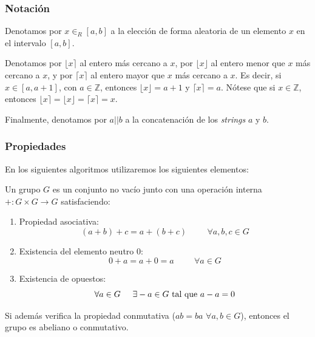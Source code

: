 \subsubsection{Notación}

Denotamos por $x \in_{R} [a, b]$ a la elección de forma aleatoria de un elemento $x$ en el intervalo $[a, b]$.

Denotamos por $\lfloor x \rceil$ al entero más cercano a $x$, por $\lfloor x \rfloor$ al entero menor que $x$ más cercano a $x$, y por $\lceil x \rceil$ al entero mayor que $x$ más cercano a $x$. Es decir, si $x \in [a, a+1]$, con $a \in \mathbb{Z}$, entonces $\lfloor x \rfloor = a+1$ y $\lceil x \rceil = a$. Nótese que si $x \in \mathbb{Z}$, entonces $\lfloor x \rceil = \lfloor x \rfloor = \lceil x \rceil = x$.

Finalmente, denotamos por $a||b$ a la concatenación de los \emph{strings} $a$ y $b$.

\subsubsection{Propiedades}

En los siguientes algoritmos utilizaremos los siguientes elementos:

\begin{definition}[Grupo]
Un grupo $G$ es un conjunto no vacío junto con una operación interna $+: G \times G \to G$ satisfaciendo:
\begin{enumerate}
    \item Propiedad asociativa:
    $$(a + b) + c = a + (b + c) \hspace{1cm} \forall a, b, c \in G$$
    \item Existencia del elemento neutro 0:
    $$0 + a = a + 0 = a \hspace{1cm} \forall a \in G$$
    \item Existencia de opuestos:
    $$\forall a \in G \hspace{0.5cm} \exists -a \in G \text{ tal que } a - a = 0$$
\end{enumerate}

Si además verifica la propiedad conmutativa ($ab = ba$ $\forall a, b \in G$), entonces el grupo es abeliano o conmutativo.
\end{definition}

